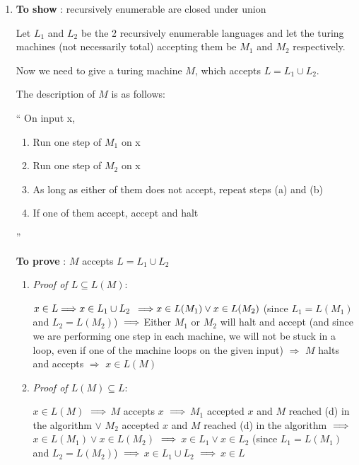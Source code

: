 \newcommand{\re}{recursively enumerable }
\begin{enumerate}
\item \textbf{To show} : \re are closed under union
    
    Let $L_1$ and $L_2$ be the 2 \re languages and let the turing machines (not necessarily total) accepting them be $M_1$ and $M_2$ respectively.

    Now we need to give a turing machine $M$, which accepts $ L = L_1 \cup L_2 $.

    The description of $M$ is as follows:

    ``
        On input x,
        \begin{enumerate}
            \item \label{union_step_1} Run one step of $M_1$ on x
            \item \label{union_step_2} Run one step of $M_2$ on x
            \item \label{union_step_3} As long as either of them does not accept, repeat steps (a) and (b)
            \item \label{union_step_4} If one of them accept, accept and halt
        \end{enumerate}
    ''

    \textbf{To prove} : $M$ accepts $L = L_1 \cup L_2$

    \begin{enumerate}
    \item \textit{Proof of $L \subseteq L(M)$}:
            
$ 
x \in L 
\newline
\Longrightarrow 
x \in L_1 \cup L_2
$
$
\newline
\Longrightarrow
x \in L(M_1) \lor x \in L(M_2)$
(since $L_1 = L(M_1)$ and $L_2 = L(M_2)$)
$
\newline
\Longrightarrow
$
Either $M_1$ or $M_2$ will halt and accept (and since we are performing one step in each machine, we will not be stuck in a loop, even if one of the machine loops on the given input)
\newline
$\Longrightarrow$
$M$ halts and accepts
\newline
$\Longrightarrow$
$ x \in L(M)$


\item \textit{Proof of $L(M) \subseteq L$}:

$x \in L(M)$
$
\newline
\Longrightarrow
$
$M$ accepts $x$
$
\newline
\Longrightarrow
$
$M_1$ accepted $x$ and $M$ reached (d)
in the algorithm 
\newline$\lor$ $M_2$ accepted $x$ and $M$ reached (d)
in the algorithm
$
\newline
\Longrightarrow
$
$x \in L(M_1) \lor x \in L(M_2)$
$
\newline
\Longrightarrow
$
$x \in L_1 \lor x \in L_2$ (since $L_1 = L(M_1)$ and $L_2 = L(M_2)$)
$
\newline
\Longrightarrow
$
$x \in L_1 \cup L_2$
$
\newline
\Longrightarrow
$
$x \in L$



\end{enumerate}
\end{enumerate}
